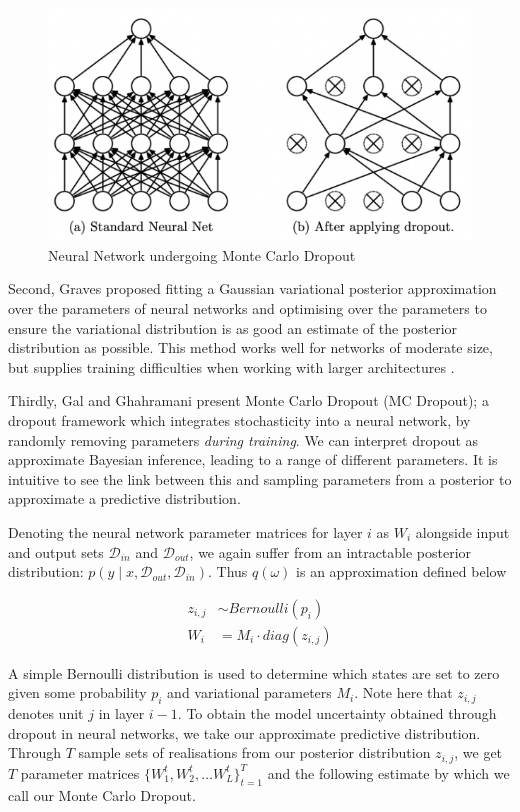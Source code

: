 \begin{figure}[h]
	\centering
	\includegraphics[width=0.5\linewidth]{../additions/figures/Srivastava14_MCDropout}
	\caption{Neural Network undergoing Monte Carlo Dropout \cite{Srivastava14}}
	\label{fig:MC_dropout}
\end{figure}

Second, Graves \cite{Graves11} proposed fitting a Gaussian variational posterior approximation over the parameters of neural networks and optimising over the parameters to ensure the variational distribution is as good an estimate of the posterior distribution as possible. This method works well for networks of moderate size, but supplies training difficulties when working with larger architectures \cite{He15}.
			
\medbreak
Thirdly, Gal and Ghahramani \cite{Gal15} present Monte Carlo Dropout (MC Dropout); a dropout framework which integrates stochasticity into a neural network, by randomly removing parameters \emph{during training}. We can interpret dropout as approximate Bayesian inference, leading to a range of different parameters. It is intuitive to see the link between this and sampling parameters from a posterior to approximate a predictive distribution.
			
\medbreak
Denoting the neural network parameter matrices for layer $i$ as $W_i$ alongside input and output sets $\mathcal{D}_{in}$ and $\mathcal{D}_{out}$, we again suffer from an intractable posterior distribution: $p(y \mid x, \mathcal{D}_{out}, \mathcal{D}_{in})$. Thus $q(\omega)$ is an approximation defined below
			
\begin{align*}
	z_{i, j} &\sim Bernoulli(p_i) \\
	W_i &= M_i \cdot diag(z_{i,j})
\end{align*}

\noindent
A simple Bernoulli distribution is used to determine which states are set to zero given some probability $p_i$ and variational parameters $M_i$. Note here that $z_{i,j}$ denotes unit $j$ in layer $i-1$. To obtain the model uncertainty obtained through dropout in neural networks, we take our approximate predictive distribution. Through $T$ sample sets of realisations from our posterior distribution $z_{i,j}$, we get $T$ parameter matrices $\{W^{t}_{1}, W^{t}_{2}, \ldots W^{t}_{L}\}^{T}_{t=1}$ and the following estimate by which we call our Monte Carlo Dropout.
			
